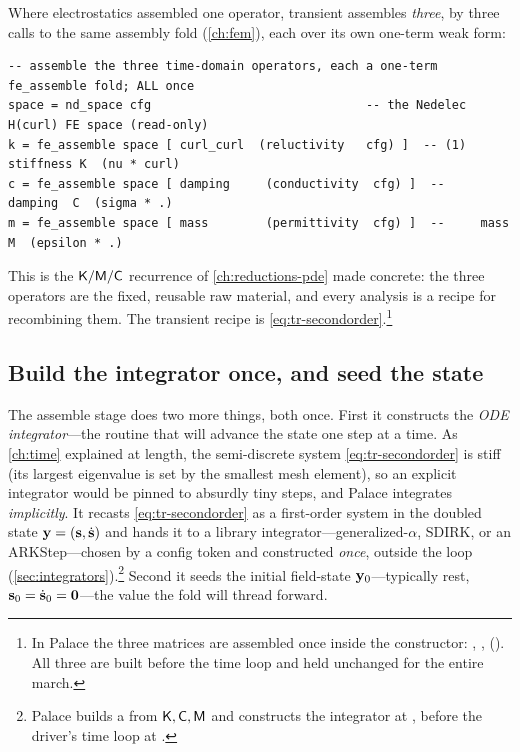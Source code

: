 Where electrostatics assembled one operator, transient assembles \emph{three}, by
three calls to the same assembly fold  (\cref{ch:fem}), each
over its own one-term weak form:
\begin{lstlisting}[style=l4style]
-- assemble the three time-domain operators, each a one-term fe_assemble fold; ALL once
space = nd_space cfg                              -- the Nedelec H(curl) FE space (read-only)
k = fe_assemble space [ curl_curl  (reluctivity   cfg) ]  -- (1) stiffness K  (nu * curl)
c = fe_assemble space [ damping     (conductivity  cfg) ]  --     damping  C  (sigma * .)
m = fe_assemble space [ mass        (permittivity  cfg) ]  --     mass     M  (epsilon * .)
\end{lstlisting}
This is the $\mathsf{K}/\mathsf{M}/\mathsf{C}$ recurrence of \cref{ch:reductions-pde} made concrete:
the three operators are the fixed, reusable raw material, and every analysis is a
recipe for recombining them. The transient recipe is
\cref{eq:tr-secondorder}.\footnote{In Palace the three matrices are assembled once
inside the  constructor:
,
,
(). All three are built before the time
loop and held unchanged for the entire march.}

\subsection{Build the integrator once, and seed the state}

The assemble stage does two more things, both once. First it constructs the
\emph{ODE integrator}---the routine that will advance the state one step at a time.
As \cref{ch:time} explained at length, the semi-discrete system
\cref{eq:tr-secondorder} is stiff (its largest eigenvalue is set by the smallest
mesh element), so an explicit integrator would be pinned to absurdly tiny steps,
and Palace integrates \emph{implicitly}. It recasts \cref{eq:tr-secondorder} as a
first-order system in the doubled state $\mathbf{y}=(\mathbf{s},\dot{\mathbf{s}})$ and hands it to a
library integrator---generalized-$\alpha$, SDIRK, or an ARKStep---chosen by a
config token and constructed \emph{once}, outside the loop
(\cref{sec:integrators}).\footnote{Palace builds a
 from $\mathsf{K},\mathsf{C},\mathsf{M}$ and constructs the
integrator at , before the driver's
time loop at .} Second it seeds the
initial field-state $\mathbf{y}_0$---typically rest, $\mathbf{s}_0=\dot{\mathbf{s}}_0=\mathbf0$---the value
the fold will thread forward.

